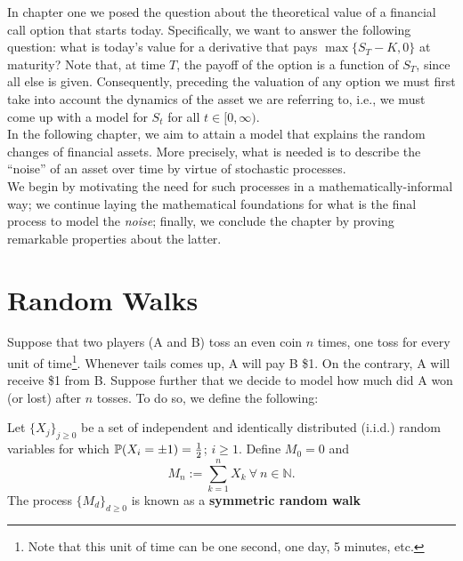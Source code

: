 \documentclass[../TGMAFFIRO]{subfiles}
\begin{document}
	



In chapter one we posed the question about the theoretical value of a financial call option that starts today. Specifically, we want to answer the following question: what is today's value for a derivative that pays $\max\{S_T-K, 0\}$ at maturity? Note that, at time $T$, the payoff of the option is a function of $S_T$, since all else is given. Consequently, preceding the valuation of any option we must first take into account the dynamics of the asset we are referring to, i.e., we must come up with a model for $S_t$ for all $t \in [0,\infty)$.\\

In the following chapter, we aim to attain a model that explains the random changes of financial assets. More precisely, what is needed is to describe the ``noise'' of an asset over time by virtue of stochastic processes.\\

We begin by motivating the need for such processes in a mathematically-informal way; we continue laying the mathematical foundations for what is the final process to model the \textit{noise}; finally, we conclude the chapter by proving remarkable properties about the latter.

\section{Random Walks}
Suppose that two players (A and B) toss an even coin $n$ times, one toss for every unit of time\footnote{Note that this unit of time can be one second, one day, 5 minutes, etc.}. Whenever tails comes up, A will pay B \$1. On the contrary, A will receive \$1 from B. Suppose further that we decide to model how much did A won (or lost) after $n$ tosses. To do so, we define the following:

\begin{definition}\label{srwalk}
	Let $\{X_j\}_{j\geq0}$ be a set of independent and identically distributed (i.i.d.) random variables for which $\mathbb{P}(X_i = \pm 1) = \frac{1}{2}$; $i \geq 1$. Define $M_0 = 0$ and
	\begin{equation}
		M_n := \sum_{k=1}^n X_k \ \forall \ n \in \mathbb{N}.
	\end{equation}
	The process $\{M_d\}_{d\geq 0}$ is known as a \textbf{symmetric random walk}
\end{definition}
\end{document}

